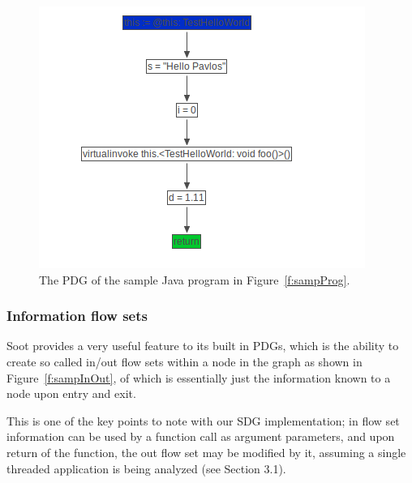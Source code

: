 \documentclass[authoryear,preprint]{sigplanconf}
\begin{document}
\begin{figure}[ht]
	\centering
	\includegraphics[width=.9\linewidth]{figures/Selection_079}
	\caption[The PDG of the sample Java program in Figure~\ref{f:sampProg}]{\label{f:sampPdg}The PDG of the sample Java program in Figure~\ref{f:sampProg}.}
\end{figure}

\subsubsection{Information flow sets}

Soot provides a very useful feature to its built in PDGs, which is the ability to create so called in/out flow sets within a node in the graph as shown in Figure~\ref{f:sampInOut}, of which is essentially just the information known to a node upon entry and exit.

This is one of the key points to note with our SDG implementation; in flow set information can be used by a function call as argument parameters, and upon return of the function, the out flow set may be modified by it, assuming a single threaded application is being analyzed (see Section 3.1).
\end{document}

